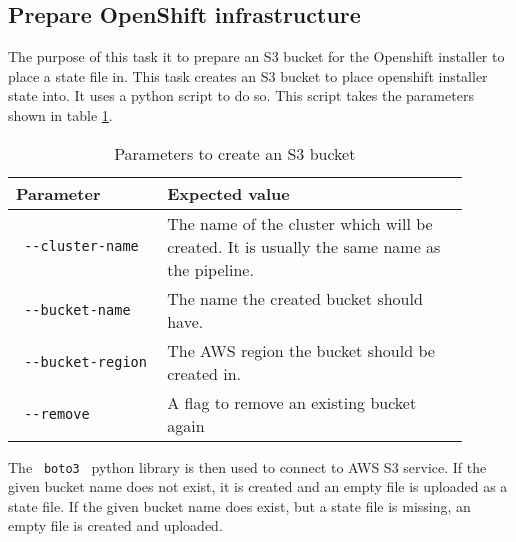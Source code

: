 \subsection{Prepare OpenShift infrastructure}\label{subsec:prepare-openshift-infrastructure}

The purpose of this task it to prepare an S3 bucket for the Openshift installer to place a state file in.
This task creates an S3 bucket to place openshift installer state into.
It uses a python script to do so.
This script takes the parameters shown in table \ref{tab:parameters-to-create-an-s3-bucket}.

\begin{table}[H]
    \centering
    \caption{Parameters to create an S3 bucket}
    \label{tab:parameters-to-create-an-s3-bucket}
    \begin{tabular}{p{0.3\linewidth}|p{0.6\linewidth}}
        Parameter & Expected value \\
        \hline
        \verb| --cluster-name | & The name of the cluster which will be created.
            It is usually the same name as the pipeline. \\
        \verb| --bucket-name | & The name the created bucket should have. \\
        \verb| --bucket-region | & The AWS region the bucket should be created in. \\
        \verb| --remove | & A flag to remove an existing bucket again \\
    \end{tabular}
\end{table}

The \verb| boto3 | python library is then used to connect to AWS S3 service.
If the given bucket name does not exist, it is created and an empty file is uploaded as a state file.
If the given bucket name does exist, but a state file is missing, an empty file is created and uploaded.
